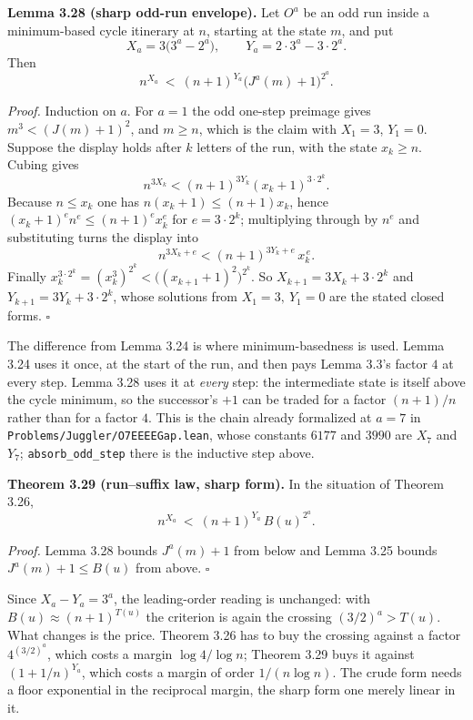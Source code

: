 \documentclass[12pt]{article}
\begin{document}
\textbf{Lemma 3.28 (sharp odd-run envelope).} Let \(O^a\) be an odd run
inside a minimum-based cycle itinerary at \(n\), starting at the state
\(m\), and put \[
X_a=3\bigl(3^a-2^a\bigr),\qquad Y_a=2\cdot 3^a-3\cdot 2^a .
\] Then \[
n^{X_a}\ <\ (n+1)^{Y_a}\bigl(J^a(m)+1\bigr)^{2^a}.
\]

\emph{Proof.} Induction on \(a\). For \(a=1\) the odd one-step preimage
gives \(m^3<(J(m)+1)^2\), and \(m\ge n\), which is the claim with
\(X_1=3\), \(Y_1=0\). Suppose the display holds after \(k\) letters of
the run, with the state \(x_k\ge n\). Cubing gives \[
n^{3X_k}<(n+1)^{3Y_k}(x_k+1)^{3\cdot 2^{k}} .
\] Because \(n\le x_k\) one has \(n(x_k+1)\le(n+1)x_k\), hence
\((x_k+1)^{e}n^{e}\le(n+1)^{e}x_k^{e}\) for \(e=3\cdot2^{k}\);
multiplying through by \(n^{e}\) and substituting turns the display into
\[
n^{3X_k+e}<(n+1)^{3Y_k+e}\,x_k^{\,e}.
\] Finally
\(x_k^{3\cdot2^k}=(x_k^3)^{2^k}<\bigl((x_{k+1}+1)^2\bigr)^{2^k}\). So
\(X_{k+1}=3X_k+3\cdot2^{k}\) and \(Y_{k+1}=3Y_k+3\cdot2^{k}\), whose
solutions from \(X_1=3,\ Y_1=0\) are the stated closed forms.
\(\square\)

The difference from Lemma 3.24 is where minimum-basedness is used. Lemma
3.24 uses it once, at the start of the run, and then pays Lemma 3.3's
factor \(4\) at every step. Lemma 3.28 uses it at \emph{every} step: the
intermediate state is itself above the cycle minimum, so the successor's
\(+1\) can be traded for a factor \((n+1)/n\) rather than for a factor
\(4\). This is the chain already formalized at \(a=7\) in
\texttt{\nolinkurl{Problems/Juggler/O7EEEEGap.lean}}, whose constants
\(6177\) and \(3990\) are \(X_7\) and \(Y_7\);
\texttt{\nolinkurl{absorb_odd_step}} there is the inductive step above.

\textbf{Theorem 3.29 (run--suffix law, sharp form).} In the situation of
Theorem 3.26, \[
n^{X_a}\ <\ (n+1)^{Y_a}\,B(u)^{2^a}.
\]

\emph{Proof.} Lemma 3.28 bounds \(J^a(m)+1\) from below and Lemma 3.25
bounds \(J^a(m)+1\le B(u)\) from above. \(\square\)

Since \(X_a-Y_a=3^a\), the leading-order reading is unchanged: with
\(B(u)\approx(n+1)^{T(u)}\) the criterion is again the crossing
\((3/2)^a>T(u)\). What changes is the price. Theorem 3.26 has to buy the
crossing against a factor \(4^{(3/2)^a}\), which costs a margin
\(\log4/\log n\); Theorem 3.29 buys it against \((1+1/n)^{Y_a}\), which
costs a margin of order \(1/(n\log n)\). The crude form needs a floor
exponential in the reciprocal margin, the sharp form one merely linear
in it.
\end{document}
